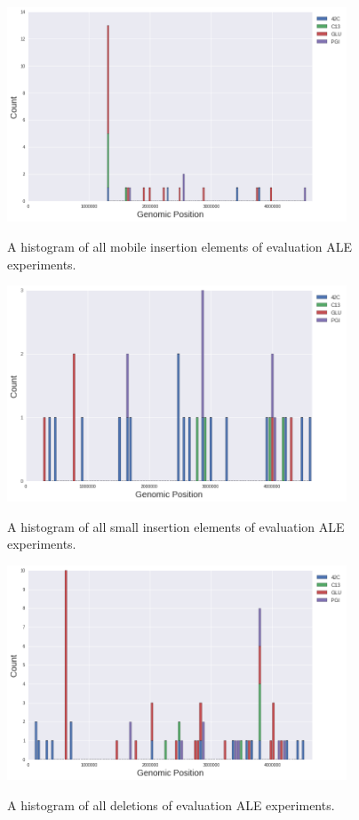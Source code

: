 \documentclass[12pt,final,masters,chapterheads]{ucsd}  %
\begin{document}
\begin{figure}[H]
  \caption{A histogram of all mobile insertion elements of evaluation ALE experiments.}
  \centering
  \includegraphics[width=0.9\textwidth]{all_mobs_topo.png}
  \label{fig:all_mobs_topo}
\end{figure}
\begin{figure}[H]
  \caption{A histogram of all small insertion elements of evaluation ALE experiments.}
  \centering
  \includegraphics[width=0.9\textwidth]{all_ins_topo.png}
  \label{fig:all_ins_topo}
\end{figure}
\begin{figure}[H]
  \caption{A histogram of all deletions of evaluation ALE experiments.}
  \centering
  \includegraphics[width=0.9\textwidth]{all_dels_topo.png}
  \label{fig:all_dels_topo}
\end{figure}
\end{document}
